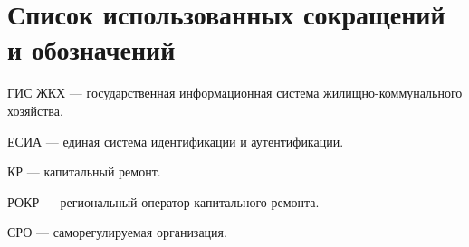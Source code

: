 \section*{Список использованных сокращений и обозначений}

ГИС ЖКХ --- государственная информационная система жи\-лищ\-но-ком\-му\-наль\-ного хозяйства.

ЕСИА --- единая система идентификации и аутентификации.

КР --- капитальный ремонт.

РОКР --- региональный оператор капитального ремонта.

СРО --- саморегулируемая организация.

\clearpage
\newpage